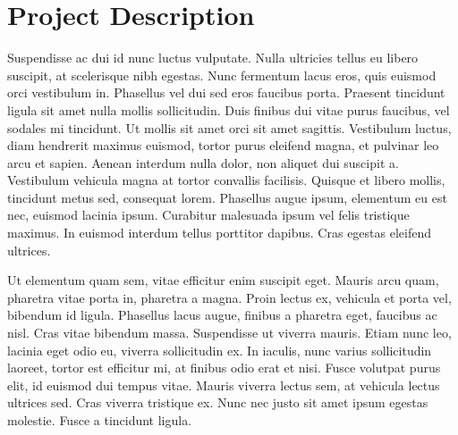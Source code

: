 \section{Project Description}

Suspendisse ac dui id nunc luctus vulputate. Nulla ultricies tellus eu libero suscipit, at scelerisque nibh egestas. Nunc fermentum lacus eros, quis euismod orci vestibulum in. Phasellus vel dui sed eros faucibus porta. Praesent tincidunt ligula sit amet nulla mollis sollicitudin. Duis finibus dui vitae purus faucibus, vel sodales mi tincidunt. Ut mollis sit amet orci sit amet sagittis. Vestibulum luctus, diam hendrerit maximus euismod, tortor purus eleifend magna, et pulvinar leo arcu et sapien. Aenean interdum nulla dolor, non aliquet dui suscipit a. Vestibulum vehicula magna at tortor convallis facilisis. Quisque et libero mollis, tincidunt metus sed, consequat lorem. Phasellus augue ipsum, elementum eu est nec, euismod lacinia ipsum. Curabitur malesuada ipsum vel felis tristique maximus. In euismod interdum tellus porttitor dapibus. Cras egestas eleifend ultrices.

Ut elementum quam sem, vitae efficitur enim suscipit eget. Mauris arcu quam, pharetra vitae porta in, pharetra a magna. Proin lectus ex, vehicula et porta vel, bibendum id ligula. Phasellus lacus augue, finibus a pharetra eget, faucibus ac nisl. Cras vitae bibendum massa. Suspendisse ut viverra mauris. Etiam nunc leo, lacinia eget odio eu, viverra sollicitudin ex. In iaculis, nunc varius sollicitudin laoreet, tortor est efficitur mi, at finibus odio erat et nisi. Fusce volutpat purus elit, id euismod dui tempus vitae. Mauris viverra lectus sem, at vehicula lectus ultrices sed. Cras viverra tristique ex. Nunc nec justo sit amet ipsum egestas molestie. Fusce a tincidunt ligula.
